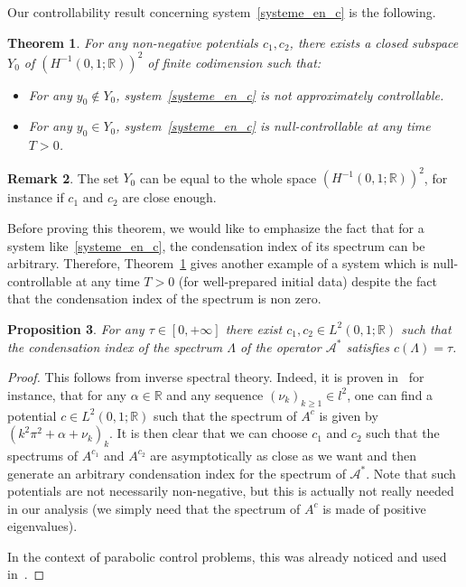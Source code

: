 \documentclass[11pt]{article}
\newtheorem{theo}{Theorem}[section]
\newtheorem{prop}[theo]{Proposition}
\theoremstyle{definition}
\newtheorem{rema}[theo]{Remark}
\numberwithin{equation}{section}
\numberwithin{figure}{section}
\numberwithin{table}{section}
\newcommand\As{\mathcal{A}^*}
\newcommand{\Fzp}{Y_0}
\newcommand{\R}{\mathbb{R}}
\begin{document}
Our controllability result concerning system~\eqref{systeme_en_c} is the following.
\begin{theo}\label{theorem_systeme_en_c}
For any non-negative potentials $c_1,c_2$, there exists a closed subspace $\Fzp$ of $(H^{-1}(0,1 ; \R))^2$ of finite codimension such that:
\begin{itemize}
\item For any $y_0\not\in \Fzp$, system~\eqref{systeme_en_c} is not approximately controllable.
\item For any $y_0\in \Fzp$, system~\eqref{systeme_en_c} is null-controllable at any time $T>0$.
\end{itemize}
\end{theo}

\begin{rema}
The set $\Fzp$ can be equal to the whole space $(H^{-1}(0,1 ; \R))^2$, for instance if $c_1$ and $c_2$ are close enough.
\end{rema}

Before proving this theorem, we would like to emphasize the fact that for a system like~\eqref{systeme_en_c}, the condensation index of its spectrum can be arbitrary. Therefore, Theorem~\ref{theorem_systeme_en_c} gives another example of a system which is null-controllable at any time $T>0$ (for well-prepared initial data) despite the fact that the condensation index of the spectrum is non zero.

\begin{prop}
For any $\tau\in [0,+\infty]$ there exist $c_1,c_2\in L^2(0,1;\R)$ such that the condensation index of the spectrum $\Lambda$ of the operator $\As$ satisfies $c(\Lambda)=\tau$.
\end{prop}

\begin{proof}
This follows from inverse spectral theory. Indeed, it is proven in~\cite[Chapter~3]{PoeschelTrubowitz:1987} for instance, that for any $\alpha\in \R$ and any sequence $(\nu_k)_{k\geq 1}\in l^2$, one can find a potential $c\in L^2(0,1;\R)$ such that the spectrum of $A^c$ is given by $(k^2\pi^2 + \alpha + \nu_k)_k$. It is then clear that we can choose $c_1$ and $c_2$ such that the spectrums of $A^{c_1}$ and $A^{c_2}$ are asymptotically as close as we want and then generate an arbitrary condensation index for the spectrum of $\As$. Note that such potentials are not necessarily non-negative, but this is actually not really needed in our analysis (we simply need that the spectrum of $A^c$ is made of positive eigenvalues).

In the context of parabolic control problems, this was already noticed and used in~\cite{Ouaili18}.
\end{proof}
\end{document}
